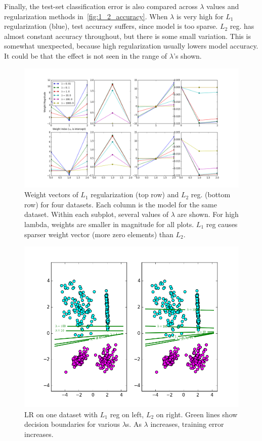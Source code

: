 Finally, the test-set classification error is also compared across $\lambda$ values and regularization methods in~\cref{fig:1_2_accuracy}.
When $\lambda$ is very high for $L_1$ regularization (blue), test accuracy suffers, since model is too sparse.
$L_2$ reg. has almost constant accuracy throughout, but there is some small variation.
This is somewhat unexpected, because high regularization usually lowers model accuracy.
It could be that the effect is not seen in the range of $\lambda$'s shown.

\begin{figure}
	\centering
	\includegraphics [trim=0 0 0 0, clip, angle=0, width=0.8\columnwidth,
	keepaspectratio]{figures/1_2_all_weights_good}
	\caption{Weight vectors of $L_1$ regularization (top row) and $L_2$ reg. (bottom row) for four datasets. Each column is the model for the same dataset. Within each subplot, several values of $\lambda$ are shown. For high lambda, weights are smaller in magnitude for all plots. $L_1$ reg causes sparser weight vector (more zero elements) than $L_2$.}
	\label{fig:1_2_all_weights_good} 
\end{figure}

\begin{figure}
	\centering
	\includegraphics [trim=0 0 0 0, clip, angle=0, width=0.8\columnwidth,
	keepaspectratio]{figures/1_2_decision}
	\caption{LR on one dataset with $L_1$ reg on left, $L_2$ on right. Green lines show decision boundaries for various $\lambda$s. As $\lambda$ increases, training error increases.} 
	\label{fig:1_2_decision} 
\end{figure}

